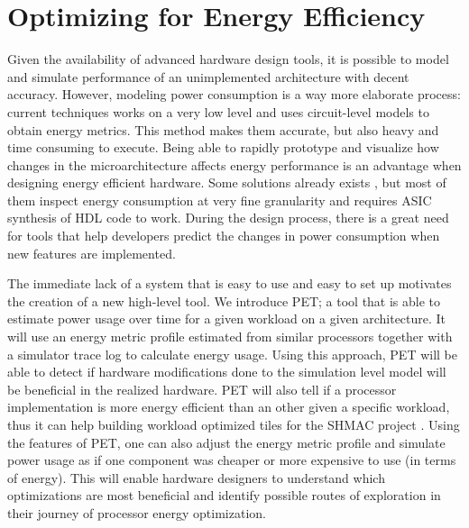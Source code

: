 \section{Optimizing for Energy Efficiency}

Given the availability of advanced hardware design tools, it is possible to
model and simulate performance of an unimplemented architecture with decent
accuracy. However, modeling power consumption is a way more elaborate process:
current techniques works on a very low level and uses circuit-level models to
obtain energy metrics. This method makes them accurate, but also heavy and time
consuming to execute. Being able to rapidly prototype and visualize how changes
in the microarchitecture affects energy performance is an advantage when
designing energy efficient hardware. Some solutions already exists
\cite{bruno2005rtl,ponomarev2002accupower}, but most of them inspect energy
consumption at very fine granularity and requires ASIC synthesis of HDL code to
work. During the design process, there is a great need for tools that help
developers predict the changes in power consumption when new features are
implemented.

The immediate lack of a system that is easy to use and easy to set up motivates
the creation of a new high-level tool. We introduce PET; a tool that is able to
estimate power usage over time for a given workload on a given architecture. It
will use an energy metric profile estimated from similar processors together
with a simulator trace log to calculate energy usage. Using this approach, PET
will be able to detect if hardware modifications done to the simulation level
model will be beneficial in the realized hardware. PET will also tell if a
processor implementation is more energy efficient than an other given a specific
workload, thus it can help building workload optimized tiles for the SHMAC
project \cite{shmacwebpage}. Using the features of PET, one can also adjust the
energy metric profile and simulate power usage as if one component was cheaper
or more expensive to use (in terms of energy). This will enable hardware designers to
understand which optimizations are most beneficial and identify possible routes
of exploration in their journey of processor energy optimization.

